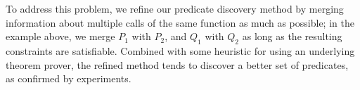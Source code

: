 \begin{enumerate}

 To address this problem, 
    we refine our predicate discovery method by merging information about
   multiple calls of the same function as much as possible; in the example
 above, we merge \(P_1\) with \(P_2\), and \(Q_1\) with \(Q_2\) as long
  as the resulting constraints are satisfiable. Combined with some heuristic
  for using an underlying theorem prover, the refined method tends to
  discover a better set of predicates, as confirmed by experiments.




\end{enumerate}
